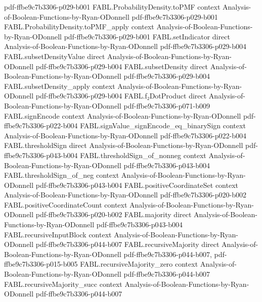 \begin{theorem}
  {pdf-ffbe9c7b3306-p029-b001}
\proofstep
  {FABL.ProbabilityDensity.toPMF}
  {context}
  {Analysis-of-Boolean-Functions-by-Ryan-ODonnell}
  {pdf-ffbe9c7b3306-p029-b001}
\proofstep
  {FABL.ProbabilityDensity.toPMF_apply}
  {context}
  {Analysis-of-Boolean-Functions-by-Ryan-ODonnell}
  {pdf-ffbe9c7b3306-p029-b001}
\proofstep
  {FABL.setIndicator}
  {direct}
  {Analysis-of-Boolean-Functions-by-Ryan-ODonnell}
  {pdf-ffbe9c7b3306-p029-b004}
\proofstep
  {FABL.subsetDensityValue}
  {direct}
  {Analysis-of-Boolean-Functions-by-Ryan-ODonnell}
  {pdf-ffbe9c7b3306-p029-b004}
\proofstep
  {FABL.subsetDensity}
  {direct}
  {Analysis-of-Boolean-Functions-by-Ryan-ODonnell}
  {pdf-ffbe9c7b3306-p029-b004}
\proofstep
  {FABL.subsetDensity_apply}
  {context}
  {Analysis-of-Boolean-Functions-by-Ryan-ODonnell}
  {pdf-ffbe9c7b3306-p029-b004}
\proofstep
  {FABL.f₂DotProduct}
  {direct}
  {Analysis-of-Boolean-Functions-by-Ryan-ODonnell}
  {pdf-ffbe9c7b3306-p071-b009}
\proofstep
  {FABL.signEncode}
  {context}
  {Analysis-of-Boolean-Functions-by-Ryan-ODonnell}
  {pdf-ffbe9c7b3306-p022-b004}
\proofstep
  {FABL.signValue_signEncode_eq_binarySign}
  {context}
  {Analysis-of-Boolean-Functions-by-Ryan-ODonnell}
  {pdf-ffbe9c7b3306-p022-b004}
\proofstep
  {FABL.thresholdSign}
  {direct}
  {Analysis-of-Boolean-Functions-by-Ryan-ODonnell}
  {pdf-ffbe9c7b3306-p043-b004}
\proofstep
  {FABL.thresholdSign_of_nonneg}
  {context}
  {Analysis-of-Boolean-Functions-by-Ryan-ODonnell}
  {pdf-ffbe9c7b3306-p043-b004}
\proofstep
  {FABL.thresholdSign_of_neg}
  {context}
  {Analysis-of-Boolean-Functions-by-Ryan-ODonnell}
  {pdf-ffbe9c7b3306-p043-b004}
\proofstep
  {FABL.positiveCoordinateSet}
  {context}
  {Analysis-of-Boolean-Functions-by-Ryan-ODonnell}
  {pdf-ffbe9c7b3306-p020-b002}
\proofstep
  {FABL.positiveCoordinateCount}
  {context}
  {Analysis-of-Boolean-Functions-by-Ryan-ODonnell}
  {pdf-ffbe9c7b3306-p020-b002}
\proofstep
  {FABL.majority}
  {direct}
  {Analysis-of-Boolean-Functions-by-Ryan-ODonnell}
  {pdf-ffbe9c7b3306-p043-b004}
\proofstep
  {FABL.recursiveInputBlock}
  {context}
  {Analysis-of-Boolean-Functions-by-Ryan-ODonnell}
  {pdf-ffbe9c7b3306-p044-b007}
\proofstep
  {FABL.recursiveMajority}
  {direct}
  {Analysis-of-Boolean-Functions-by-Ryan-ODonnell}
  {pdf-ffbe9c7b3306-p044-b007,
    pdf-ffbe9c7b3306-p015-b005}
\proofstep
  {FABL.recursiveMajority_zero}
  {context}
  {Analysis-of-Boolean-Functions-by-Ryan-ODonnell}
  {pdf-ffbe9c7b3306-p044-b007}
\proofstep
  {FABL.recursiveMajority_succ}
  {context}
  {Analysis-of-Boolean-Functions-by-Ryan-ODonnell}
  {pdf-ffbe9c7b3306-p044-b007}

\end{theorem}
